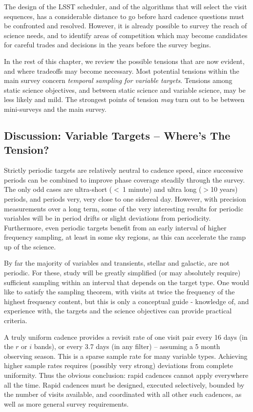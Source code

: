 The design of the LSST scheduler, and of the algorithms that will select
the visit sequences, has a considerable distance to go before hard
cadence questions must be confronted and resolved.  However, it is
already possible to survey the reach of science needs, and to identify
areas of competition which may become candidates for careful trades and
decisions in the years before the survey begins.

In the rest of this chapter, we review the possible tensions that are
now evident, and where tradeoffs may become necessary. Most potential
tensions within the main survey concern {\it temporal sampling for
variable targets}.  Tensions among static science objectives, and
between static science and variable science, may be less likely and
mild. The strongest points of tension {\it may} turn out to be between
mini-surveys and the main survey.


\subsection{Discussion: Variable Targets -- Where's The Tension?}

Strictly periodic targets are relatively neutral to cadence speed, since
successive periods can be combined to improve phase coverage steadily
through the survey.  The only odd cases are ultra-short ($<~ $1 minute)
and ultra long ($> $10 years) periods, and periods very, very close to
one sidereal day.  However, with precision measurements over a long
term, some of the very interesting results for periodic variables will
be in period drifts or slight deviations from periodicity. Furthermore,
even periodic targets benefit from an early interval of higher frequency
sampling, at least in some sky regions, as this can accelerate the ramp
up of the science.

By far the majority of variables and transients, stellar and galactic,
are not periodic. For these, study will be greatly simplified (or may
absolutely require) sufficient sampling within an interval that depends
on the target type. One would like to satisfy the sampling theorem, with
visits at twice the frequency of the highest frequency content, but this
is only a conceptual guide - knowledge of, and experience with, the
targets and the science objectives can provide practical criteria.

A truly uniform cadence provides a revisit rate of one visit pair every
16 days (in the $r$ or $i$ bands), or every 3.7 days (in any filter) --
assuming a 5 month observing season.  This is a sparse sample rate for
many variable types.  Achieving higher sample rates requires (possibly
very strong) deviations from complete uniformity.  Thus the obvious
conclusion: rapid cadences cannot apply everywhere all the time. Rapid
cadences must be designed, executed selectively, bounded by the number
of visits available, and coordinated with all other such cadences, as
well as more general survey requirements.

